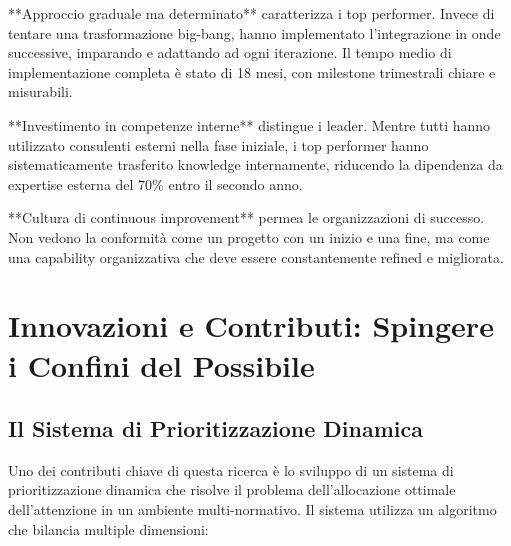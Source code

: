 **Approccio graduale ma determinato** caratterizza i top performer. Invece di tentare una trasformazione big-bang, hanno implementato l'integrazione in onde successive, imparando e adattando ad ogni iterazione. Il tempo medio di implementazione completa è stato di 18 mesi, con milestone trimestrali chiare e misurabili.

**Investimento in competenze interne** distingue i leader. Mentre tutti hanno utilizzato consulenti esterni nella fase iniziale, i top performer hanno sistematicamente trasferito knowledge internamente, riducendo la dipendenza da expertise esterna del 70\% entro il secondo anno.

**Cultura di continuous improvement** permea le organizzazioni di successo. Non vedono la conformità come un progetto con un inizio e una fine, ma come una capability organizzativa che deve essere constantemente refined e migliorata.

\section{Innovazioni e Contributi: Spingere i Confini del Possibile}

\subsection{Il Sistema di Prioritizzazione Dinamica}

Uno dei contributi chiave di questa ricerca è lo sviluppo di un sistema di prioritizzazione dinamica che risolve il problema dell'allocazione ottimale dell'attenzione in un ambiente multi-normativo. Il sistema utilizza un algoritmo che bilancia multiple dimensioni:

